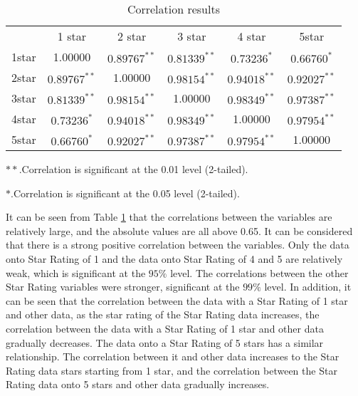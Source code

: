 \documentclass{mcmthesis}
\begin{document}
\begin{table}[h]
	\caption{Correlation results}\label{q5b1}
	\centering
	\begin{threeparttable}
		\begin{tabular}{cccccc}
			& & & & & \\
			\toprule & 1 star & 2 star & 3 star & 4 star & 5star \\
			\midrule 1star & 1.00000 & $0.89767^{* *}$ & $0.81339^{* *}$ & $0.73236^{*}$ & $0.66760^{*}$ \\
			2star & $0.89767^{* *}$ & 1.00000 & $0.98154^{* *}$ & $0.94018^{* *}$ & $0.92027^{* *}$ \\
			3star & $0.81339^{* *}$ & $0.98154^{* *}$ & 1.00000 & $0.98349^{* *}$ & $0.97387^{* *}$ \\
			4star & $0.73236^{*}$ & $0.94018^{* *}$ & $0.98349^{* *}$ & 1.00000 & $0.97954^{* *}$ \\
			5star & $0.66760^{*}$ & $0.92027^{* *}$ & $0.97387^{* *}$ & $0.97954^{* *}$ & 1.00000 \\
			\bottomrule								
		\end{tabular}
		\begin{tablenotes}
			\footnotesize
			\item[1] \(* *.\)Correlation is significant at the 0.01 level (2-tailed). 
			\item[2] \(*.\)Correlation is significant at the 0.05 level (2-tailed).
		\end{tablenotes}
	\end{threeparttable}
\end{table}

It can be seen from Table \ref{q5b1} that the correlations between the variables are relatively large, and the absolute values are all above 0.65. It can be considered that there is a strong positive correlation between the variables. Only the data onto Star Rating of 1 and the data onto Star Rating of 4 and 5 are relatively weak, which is significant at the \(95 \%\) level. The correlations between the other Star Rating variables were stronger, significant at the \(99 \%\) level. In addition, it can be seen that the correlation between the data with a Star Rating of 1 star and other data, as the star rating of the Star Rating data increases, the correlation between the data with a Star Rating of 1 star and other data gradually decreases. The data onto a Star Rating of 5 stars has a similar relationship. The correlation between it and other data increases to the Star Rating data stars starting from 1 star, and the correlation between the Star Rating data onto 5 stars and other data gradually increases.
\end{document}
